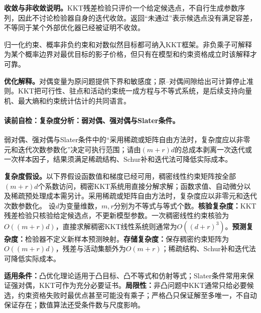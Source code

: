 \textbf{收敛与非收敛说明。}KKT残差检验只评价一个给定候选点，不自行生成参数序列，因此不讨论检验器自身的迭代收敛。返回“未通过”表示候选点没有满足容差，不等同于某个外部优化器已经被证明不收敛。


\label{struct:V1-C07-CH17}
\begin{probabilitybox}
归一化约束、概率非负约束和对数似然目标都可纳入KKT框架。非负乘子可解释为某个概率边界对最优目标的影子价格，但只有在模型和约束资格成立时该解释才可靠。
\end{probabilitybox}
\label{struct:V1-C07-CH18}
\begin{optimizationbox}
\textbf{优化解释。}对偶变量为原问题提供下界和敏感度；原--对偶间隙给出可计算停止准则。KKT把可行性、驻点和活动约束统一成方程与不等式系统，是后续支持向量机、最大熵和约束统计估计的共同语言。
\end{optimizationbox}

\label{struct:V1-C07-CH28}
\label{struct:V1-C07-CH29}
\paragraph{读前自检：复杂度分析：弱对偶、强对偶与Slater条件。}弱对偶、强对偶与Slater条件中的“采用稀疏或矩阵自由方法时，复杂度应以非零元和迭代次数参数化”决定可执行范围；请由$(m+r)d$的总成本剥离一次迭代或一次样本因子，结果须满足稀疏结构、Schur补和迭代法可降低实际成本。\par

\begin{complexitybox}
\textbf{复杂度假设。}以下界假设函数值和梯度已经可用，稠密线性约束矩阵按全部$(m+r)d$个系数访问，稠密KKT系统用直接分解求解；函数求值、自动微分以及稀疏预处理成本需另计。采用稀疏或矩阵自由方法时，复杂度应以非零元和迭代次数参数化。
设$d$为变量维数，$m,r$分别为不等式与等式个数。\textbf{核验复杂度：}KKT残差检验只核验给定候选点，不更新模型参数。一次稠密线性约束核验为$O((m+r)d)$，直接求解稠密KKT线性系统则通常为$O((d+r)^3)$。\textbf{预测复杂度：}检验器不定义新样本预测映射。\textbf{存储复杂度：}保存稠密约束矩阵为$O((m+r)d)$，残差与活动集额外为$O(m+r)$；稀疏结构、Schur补和迭代法可降低实际成本。
\end{complexitybox}

\label{struct:V1-C07-CH30}
\label{struct:V1-C07-CH31}
\begin{applicabilitybox}
\textbf{适用条件：}凸优化理论适用于凸目标、凸不等式和仿射等式；Slater条件常用来保证强对偶，KKT可作为充分必要证书。\textbf{局限性：}非凸问题中KKT通常只给必要候选，约束资格失败时最优点甚至可能没有乘子；严格凸只保证解至多唯一，不自动保证存在；数值算法还受条件数与尺度影响。
\end{applicabilitybox}

